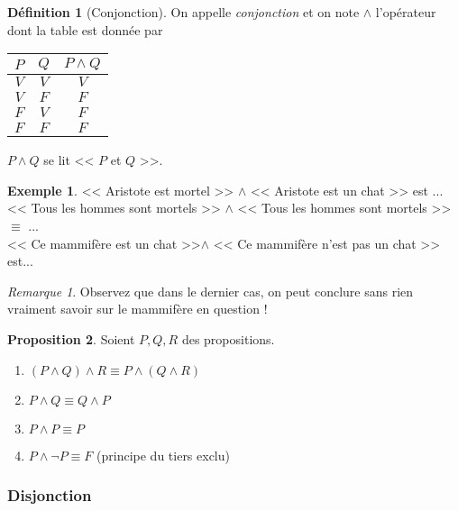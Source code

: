 \documentclass[11pt]{article}
\theoremstyle{definition}
\newtheorem{defn}{Définition}[section]
\newtheorem{prop}[defn]{Proposition}
\newtheorem{exe}{Exemple}
\theoremstyle{remark}
\newtheorem{rem}{Remarque}
\begin{document}
\begin{defn}[Conjonction]
On appelle \textit{conjonction} et on note $\land$ l'opérateur dont la table est donnée par

\begin{table}[!ht]
\centering
\begin{tabular}{|c|c|c|}\hline
$P$ & $Q$ & $P\land Q$ \\ \hline
$V$ & $V$ & $V$ \\\hline
$V$ & $F$ & $F$ \\\hline
$F$ & $V$ & $F$ \\\hline
$F$ & $F$ & $F$ \\\hline
\end{tabular}
\end{table}

$P\land Q$ se lit << $P$ et $Q$ >>.
\end{defn}

\begin{exe}
<< Aristote est mortel >> $\land$ << Aristote est un chat >> est ...\\
<< Tous les hommes sont mortels >> $\land$ << Tous les hommes sont mortels >> $\equiv$ ...\\
<< Ce mammifère est un chat >>$\land $ << Ce mammifère n'est pas un chat >> est...
\end{exe}

\begin{rem} Observez que dans le dernier cas, on peut conclure sans rien vraiment savoir sur le mammifère en question !
\end{rem}

\begin{prop}
Soient $P,Q,R$ des propositions.
\begin{enumerate}
\item $(P\land Q)\land R \equiv P\land (Q\land R)$
\item $P\land Q \equiv Q\land P$
\item $P\land P\equiv P$
\item $P\land \neg P \equiv F$ (principe du tiers exclu)
\end{enumerate}

\end{prop}



\subsubsection{Disjonction}
\end{document}
